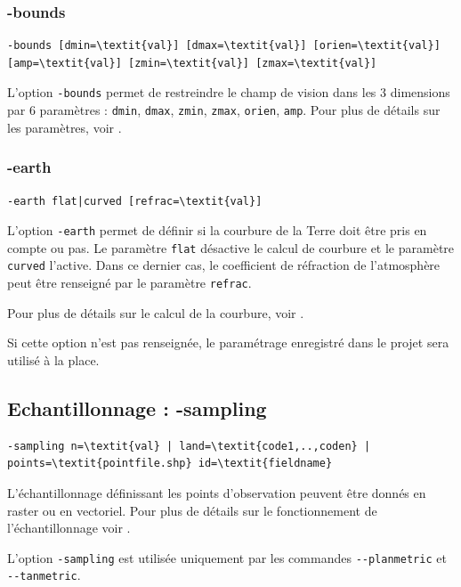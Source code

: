 \documentclass{report}
\begin{document}
\subsubsection{-bounds}
\begin{Verbatim}[commandchars=\\\{\}]
-bounds [dmin=\textit{val}] [dmax=\textit{val}] [orien=\textit{val}] [amp=\textit{val}] [zmin=\textit{val}] [zmax=\textit{val}]
\end{Verbatim}
L'option \verb|-bounds| permet de restreindre le champ de vision dans les 3 dimensions par 6 paramètres : \verb|dmin|, \verb|dmax|, \verb|zmin|, \verb|zmax|, \verb|orien|, \verb|amp|. Pour plus de détails sur les paramètres, voir .

\subsubsection{-earth}
\begin{Verbatim}[commandchars=\\\{\}]
-earth flat|curved [refrac=\textit{val}]
\end{Verbatim}

L'option \verb|-earth| permet de définir si la courbure de la Terre doit être pris en compte ou pas. Le paramètre \verb|flat| désactive le calcul de courbure et le paramètre \verb|curved| l'active. Dans ce dernier cas, le coefficient de réfraction de l'atmosphère peut être renseigné par le paramètre \verb|refrac|.

Pour plus de détails sur le calcul de la courbure, voir .

Si cette option n'est pas renseignée, le paramétrage enregistré dans le projet sera utilisé à la place.

\subsection{Echantillonnage : -sampling}
\begin{Verbatim}[commandchars=\\\{\}]
-sampling n=\textit{val} | land=\textit{code1,..,coden} | points=\textit{pointfile.shp} id=\textit{fieldname}
\end{Verbatim}

L'échantillonnage définissant les points d'observation peuvent être donnés en raster ou en vectoriel. Pour plus de détails sur le fonctionnement de l'échantillonnage voir .

L'option \verb|-sampling| est utilisée uniquement par les commandes \verb|--planmetric| et  \verb|--tanmetric|.
\end{document}
